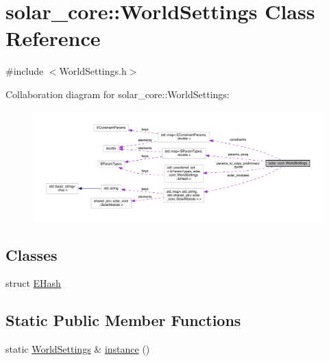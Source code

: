 \hypertarget{classsolar__core_1_1_world_settings}{}\section{solar\+\_\+core\+:\+:World\+Settings Class Reference}
\label{classsolar__core_1_1_world_settings}


{\ttfamily \#include $<$World\+Settings.\+h$>$}



Collaboration diagram for solar\+\_\+core\+:\+:World\+Settings\+:\nopagebreak
\begin{figure}[H]
\begin{center}
\leavevmode
\includegraphics[width=350pt]{classsolar__core_1_1_world_settings__coll__graph}
\end{center}
\end{figure}
\subsection*{Classes}
\begin{DoxyCompactItemize}
\item 
struct \hyperlink{structsolar__core_1_1_world_settings_1_1_e_hash}{E\+Hash}
\end{DoxyCompactItemize}
\subsection*{Static Public Member Functions}
\begin{DoxyCompactItemize}
\item 
static \hyperlink{classsolar__core_1_1_world_settings}{World\+Settings} \& \hyperlink{classsolar__core_1_1_world_settings_a719e11b52a0e087f8c0dd11d9f65da88}{instance} ()
\end{DoxyCompactItemize}
